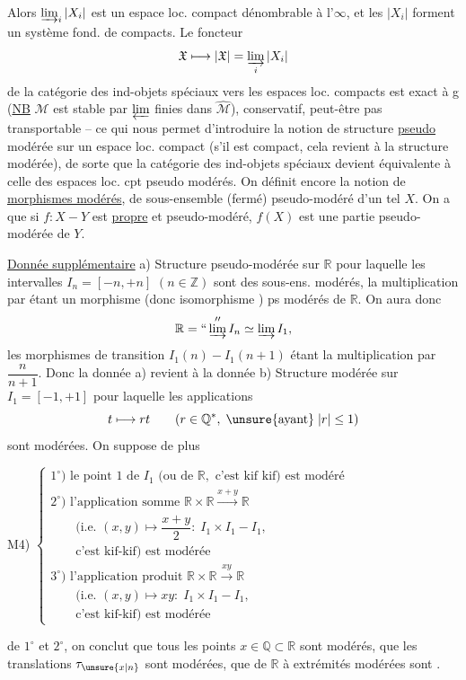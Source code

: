 Alors $\varinjlim_i|X_i|$ est un espace loc. compact dénombrable à l'$\infty$, et les $|X_i|$ forment un système fond. de compacts. Le foncteur
\[
\mathfrak X\longmapsto|\mathfrak X|=\varinjlim_i|X_i|
\]
de la catégorie  des ind-objets spéciaux  vers les espaces loc. compacts est exact à g (\uline{NB} $\mathcal M$ est stable par $\varprojlim$ finies dans $\widehat{\mathcal M}$), conservatif, peut-être pas transportable -- ce qui nous permet d'introduire la notion de structure \uline{pseudo} modérée sur un espace loc. compact (s'il est compact, cela revient à la structure modérée), de sorte que la catégorie des ind-objets spéciaux devient équivalente à celle des espaces loc. cpt pseudo modérés. On définit encore la notion de \uline{morphismes  modérés}, de sous-ensemble (fermé) pseudo-modéré d'un tel $X$. On a que si $f:X-Y$ est \uline{propre} et pseudo-modéré, $f(X)$ est une partie pseudo-modérée de $Y$.

\uline{Donnée supplémentaire} a) Structure pseudo-modérée sur $\mathbb R$ pour laquelle les intervalles $I_n=[-n,+n]$ $(n\in\mathbb Z)$ sont des sous-ens.  modérés, la multiplication par  étant un morphisme (donc isomorphisme ) ps modérés  de $\mathbb R$. On aura donc
\[
\mathbb R=``\varinjlim'' I_n\simeq\varinjlim I_1,
\]
les morphismes de transition $I_1(n)-I_1(n+1)$ étant la multiplication par $\dfrac n{n+1}$.
Donc la donnée a) revient à la donnée b) Structure modérée sur $I_1=[-1,+1]$ pour laquelle les applications
\[
t\longmapsto rt\qquad(r\in\mathbb Q^*,\;\unsure{\text{ayant}}\;|r|\leq1)
\]
sont modérées. On suppose de plus

M4) $\left\{\begin{array}{l}
1^\circ)\text{ le point }1\text{ de }I_1\text{ (ou de }\mathbb R,\text{ c'est kif kif) est modéré}\\
2^\circ)\text{ l'application somme }\mathbb R\times\mathbb R\xrightarrow{x+y}\mathbb R\\
\qquad(\text{i.e. }(x,y)\longmapsto\dfrac{x+y}{2}:\;I_1\times I_1-I_1,\\
\qquad\text{c'est kif-kif) est modérée}\\
3^\circ)\text{ l'application produit }\mathbb R\times\mathbb R\xrightarrow{xy}\mathbb R\\
\qquad(\text{i.e. }(x,y)\longmapsto xy:\;I_1\times I_1-I_1,\\
\qquad\text{c'est kif-kif) est modérée}
\end{array}\right.$

de $1^\circ$ et $2^\circ$, on conclut que tous les points $x\in\mathbb Q\subset\mathbb R$ sont modérés, que les translations  $\tau_{\unsure{x|n}}$  sont modérées, que  de $\mathbb R$ à extrémités modérées sont .

